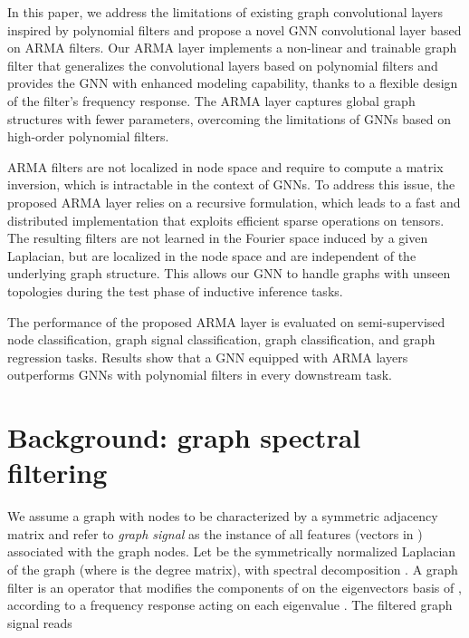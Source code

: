 \documentclass{article}
\begin{document}
In this paper, we address the limitations of existing graph convolutional layers inspired by polynomial filters and propose a novel GNN convolutional layer based on ARMA filters.
Our ARMA layer implements a non-linear and trainable graph filter that generalizes the convolutional layers based on polynomial filters and provides the GNN with enhanced modeling capability, thanks to a flexible design of the filter's frequency response.
The ARMA layer captures global graph structures with fewer parameters, overcoming the limitations of GNNs based on high-order polynomial filters.

ARMA filters are not localized in node space and require to compute a matrix inversion, which is intractable in the context of GNNs.
To address this issue, the proposed ARMA layer relies on a recursive formulation, which leads to a fast and distributed implementation that exploits efficient sparse operations on tensors.
The resulting filters are not learned in the Fourier space induced by a given Laplacian, but are localized in the node space and are independent of the underlying graph structure.
This allows our GNN to handle graphs with unseen topologies during the test phase of inductive inference tasks.

The performance of the proposed ARMA layer is evaluated on semi-supervised node classification, graph signal classification, graph classification, and graph regression tasks. 
Results show that a GNN equipped with ARMA layers outperforms GNNs with polynomial filters in every downstream task.

\section{Background: graph spectral filtering}
\label{sec:spectral_filter}

We assume a graph with  nodes to be characterized by a symmetric adjacency matrix  and refer to \textit{graph signal}  as the instance of all features (vectors in ) associated with the graph nodes.
Let  be the symmetrically normalized Laplacian of the graph (where  is the degree matrix), with spectral decomposition .
A graph filter is an operator that modifies the components of  on the eigenvectors basis of , according to a frequency response  acting on each eigenvalue . 
The filtered graph signal reads
\end{document}
